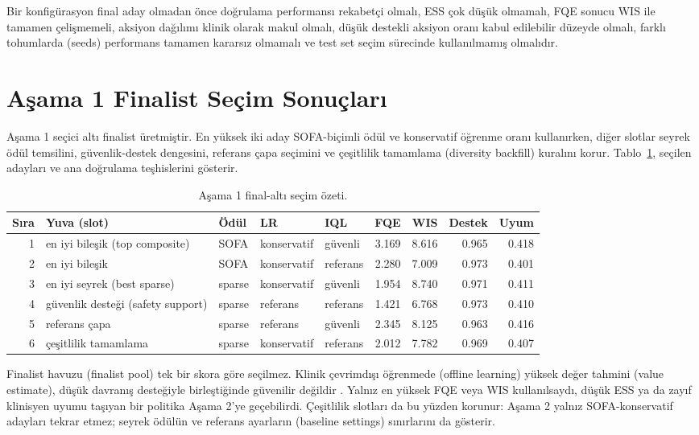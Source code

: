 \documentclass[conference]{IEEEtran}
\begin{document}
Bir konfigürasyon final aday olmadan önce doğrulama performansı rekabetçi olmalı, ESS çok düşük olmamalı, FQE sonucu WIS ile tamamen çelişmemeli, aksiyon dağılımı klinik olarak makul olmalı, düşük destekli aksiyon oranı kabul edilebilir düzeyde olmalı, farklı tohumlarda (seeds) performans tamamen kararsız olmamalı ve test set seçim sürecinde kullanılmamış olmalıdır.

\section{Aşama 1 Finalist Seçim Sonuçları}
Aşama 1 seçici altı finalist üretmiştir. En yüksek iki aday SOFA-biçimli ödül ve konservatif öğrenme oranı kullanırken, diğer slotlar seyrek ödül temsilini, güvenlik-destek dengesini, referans çapa seçimini ve çeşitlilik tamamlama (diversity backfill) kuralını korur. Tablo~\ref{tab:finalists}, seçilen adayları ve ana doğrulama teşhislerini gösterir.

\begin{table}[t]
\centering
\caption{Aşama 1 final-altı seçim özeti.}
\label{tab:finalists}
\begin{tabular}{rllllrrrr}
\toprule
Sıra & Yuva (slot) & Ödül & LR & IQL & FQE & WIS & Destek & Uyum \\
\midrule
1 & en iyi bileşik (top composite) & SOFA & konservatif & güvenli & 3.169 & 8.616 & 0.965 & 0.418 \\
2 & en iyi bileşik & SOFA & konservatif & referans & 2.280 & 7.009 & 0.973 & 0.401 \\
3 & en iyi seyrek (best sparse) & sparse & konservatif & güvenli & 1.954 & 8.740 & 0.971 & 0.411 \\
4 & güvenlik desteği (safety support) & sparse & referans & referans & 1.421 & 6.768 & 0.973 & 0.410 \\
5 & referans çapa & sparse & referans & güvenli & 2.345 & 8.125 & 0.963 & 0.416 \\
6 & çeşitlilik tamamlama & sparse & konservatif & referans & 2.012 & 7.782 & 0.969 & 0.407 \\
\bottomrule
\end{tabular}
\end{table}

Finalist havuzu (finalist pool) tek bir skora göre seçilmez. Klinik çevrimdışı öğrenmede (offline learning) yüksek değer tahmini (value estimate), düşük davranış desteğiyle birleştiğinde güvenilir değildir \cite{gottesman2019guidelines}. Yalnız en yüksek FQE veya WIS kullanılsaydı, düşük ESS ya da zayıf klinisyen uyumu taşıyan bir politika Aşama 2'ye geçebilirdi. Çeşitlilik slotları da bu yüzden korunur: Aşama 2 yalnız SOFA-konservatif adayları tekrar etmez; seyrek ödülün ve referans ayarların (baseline settings) sınırlarını da gösterir.
\end{document}
